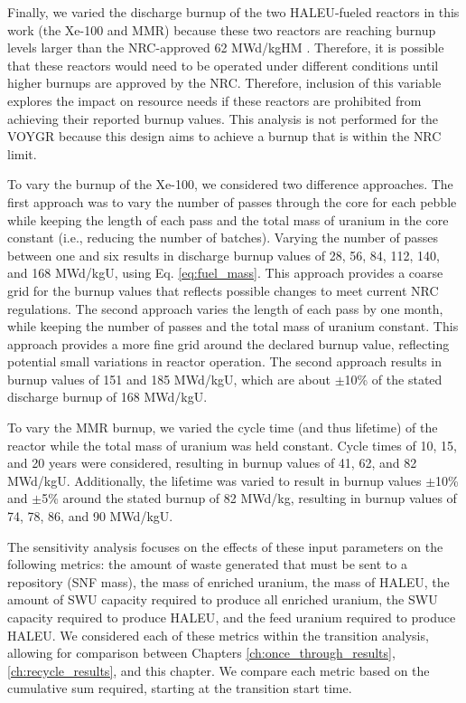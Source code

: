 Finally, we varied the discharge burnup of the two \gls{HALEU}-fueled 
reactors in this work (the Xe-100 and \gls{MMR}) because these two reactors 
are reaching burnup levels larger than the \gls{NRC}-approved 62 MWd/kgHM 
\cite{noauthor_higher_2023}. Therefore, it is possible that these 
reactors would need to be operated under different conditions until
higher burnups are approved by the \gls{NRC}.
Therefore, inclusion of this variable explores the impact 
on resource needs if these reactors are prohibited from achieving 
their 
reported burnup values. This analysis is not performed for the VOYGR because this 
design aims to achieve a burnup that is within the \gls{NRC} limit. 

To vary the burnup of the Xe-100, we considered two difference approaches. The 
first approach was to vary the number of passes through the core for each pebble 
while keeping the length of each pass and the total mass of uranium 
in the core constant (i.e., reducing the number of batches). Varying the 
number of passes between one and six 
results in discharge burnup values of 28, 56, 84, 112, 140, and 168 MWd/kgU, 
using Eq. \ref{eq:fuel_mass}. This approach provides a coarse grid 
for the burnup values that reflects possible changes to meet current 
\gls{NRC} regulations. The second approach varies the length 
of each pass by one month, while keeping the number of passes and the 
total mass of uranium 
constant. This approach provides a more fine grid around the declared 
burnup value, reflecting potential small variations in reactor operation. 
The second approach results in burnup values of 151 and 185 MWd/kgU, 
which are about $\pm$10\% of the stated discharge burnup of 168 MWd/kgU. 

To vary the \gls{MMR} burnup, we varied the cycle time (and thus lifetime) of 
the reactor while the total mass of uranium was held constant. 
Cycle times of 10, 15, and 20 years were considered, resulting in burnup 
values of 41, 62, and 82 MWd/kgU. Additionally, the lifetime was varied to 
result in burnup values $\pm$10\% and $\pm$5\% around the stated burnup of 
82 MWd/kg, resulting in burnup values of 74, 78, 86, and 90 MWd/kgU. 

The sensitivity analysis focuses on the effects of these input parameters 
on the following metrics: the amount of waste generated that 
must be sent to a repository (\gls{SNF} mass), the mass of enriched uranium, 
the mass of \gls{HALEU},
the amount of \gls{SWU} capacity required to produce all enriched uranium, the 
\gls{SWU} capacity required to produce \gls{HALEU}, and the feed uranium 
required to produce \gls{HALEU}. We considered each of these metrics 
within the transition analysis, allowing for comparison between Chapters 
\ref{ch:once_through_results}, \ref{ch:recycle_results}, and this chapter. 
We compare each metric based on the cumulative sum required, starting 
at the transition start time. 






